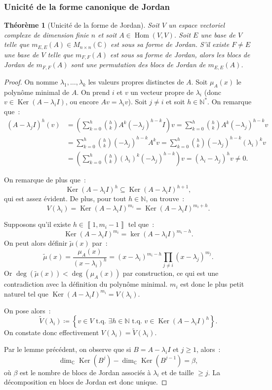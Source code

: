 \documentclass{article}
\DeclareMathOperator{\Ker}{Ker}
\DeclareMathOperator{\Hom}{Hom}
\newcommand{\N}{\mathbb N}
\newcommand{\C}{\mathbb C}
\newcommand{\M}[3]{M_{#1 \times #2}(#3)}
\newcommand{\tq}{\textrm{ t.q. }}
\newcommand{\intint}[2]{\left\llbracket#1, #2\right\rrbracket}
\newtheorem{thm}{Théorème}[section]
\theoremstyle{definition}
\theoremstyle{remark}
\begin{document}
		\subsubsection{Unicité de la forme canonique de Jordan}
		\begin{thm}[Unicité de la forme de Jordan] Soit $V$ un espace vectoriel complexe de dimension finie $n$ et soit $A \in \Hom(V, V)$. Soit $E$ une base
		de $V$ telle que $m_{E, E}(A) \in \M nn\C$ est sous sa forme de Jordan. S'il existe $F \neq E$ une base de $V$ telle que $m_{F, F}(A)$ est sous sa forme
		de Jordan, alors les blocs de Jordan de $m_{F, F}(A)$ sont une permutation des blocs de Jordan de $m_{E, E}(A)$.
		\end{thm}

		\begin{proof} On nomme $\lambda_1, \dotsc, \lambda_k$ les valeurs propres distinctes de $A$. Soit $\mu_A(x)$ le polynôme minimal de $A$. On prend $i$ et
		$v$ un vecteur propre de $\lambda_i$ (donc $v \in \Ker(A-\lambda_iI)$, ou encore $Av = \lambda_iv$). Soit $j \neq i$ et soit $h \in \N^*$. On remarque
		que~:
		\begin{align*}
			(A-\lambda_jI)^h(v) &= \left(\sum_{k=0}^h\binom hkA^k(-\lambda_j)^{h-k}I\right)v = \sum_{k=0}^h\binom hkA^k(-\lambda_j)^{h-k}v \\
			&= \sum_{k=0}^h\binom hk(-\lambda_j)^{h-k}A^kv = \sum_{k=0}^h\binom hk(-\lambda_j)^{h-k}(\lambda_i)^kv \\
			&= \left(\sum_{k=0}^h\binom hk(\lambda_i)^k(-\lambda_j)^{h-k}\right)v = (\lambda_i-\lambda_j)^hv \neq 0.
		\end{align*}

		On remarque de plus que~:
		\[\Ker(A-\lambda_i I)^h \subseteq \Ker(A - \lambda_i I)^{h+1},\]
		qui est assez évident. De plus, pour tout $h \in \N$, on trouve~:
		\[V(\lambda_i) = \Ker(A - \lambda_i I)^{m_i} = \Ker(A-\lambda_i I)^{m_i + h}.\]

		Supposons qu'il existe $h \in \intint 1{m_i-1}$ tel que~:
		\[\Ker(A-\lambda_iI)^{m_i} = \ker(A-\lambda_iI)^{m_i-h}.\]
		On peut alors définir $\widetilde \mu(x)$ par~:
		\[\widetilde \mu(x) = \frac {\mu_A(x)}{(x-\lambda_i)^h} = (x-\lambda_i)^{m_i-h}\prod_{j \neq i}(x-\lambda_j)^{m_j}.\]
		Or $\deg(\widetilde \mu(x)) < \deg(\mu_A(x))$ par construction, ce qui est une contradiction avec la définition du polynôme minimal. $m_i$ est donc le
		plus petit naturel tel que $\Ker(A-\lambda_i I)^{m_i} = V(\lambda_i)$.

		On pose alors~:
		\[\widetilde V(\lambda_i) \coloneqq \left\{v \in V \tq \exists h \in \N \tq v \in \Ker(A-\lambda_i I)^h\right\}.\]
		On constate donc effectivement $V(\lambda_i) = \widetilde V(\lambda_i)$.

		Par le lemme précédent, on observe que si $B = A-\lambda_iI$ et $j \geq 1$, alors~:
		\[\dim_\C\Ker(B^j) - \dim_\C\Ker(B^{j-1}) = \beta,\]
		où $\beta$ est le nombre de blocs de Jordan associés à $\lambda_i$ et de taille $\geq j$. La décomposition en blocs de Jordan est donc unique.
		\end{proof}
\end{document}
